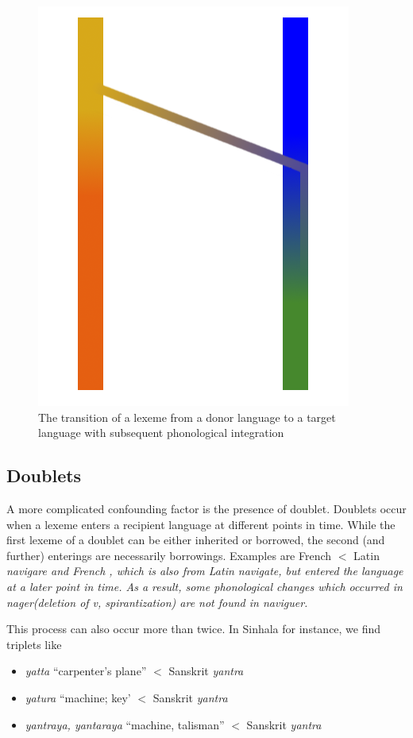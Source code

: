 \documentclass[a4paper,10pt]{article}
\begin{document}
\begin{figure}
\centering
    \includegraphics[height=.3\textheight]{borrowing.png}
\caption{The transition of a lexeme from a donor language to a target language with subsequent phonological integration}
\end{figure}

\subsection{Doublets}
A more complicated confounding factor is the presence of doublet. Doublets occur when a lexeme enters a recipient language at different points in time. While the first lexeme of a doublet can be either inherited or borrowed, the second (and further) enterings are necessarily borrowings. Examples are French $<$ Latin \em navigare \em and French , which is also from Latin \em navigate\em, but entered the language at a later point in time. As a result, some phonological changes which occurred in \em nager\em (deletion of \em v\em, spirantization) are not found in \em naviguer\em.

This process can also occur more than twice. In Sinhala for instance, we find triplets like
\begin{itemize}
   \item  {\em yatta} ``carpenter's plane'' $<$ Sanskrit {\em yantra}
   \item {\em yatura} ``machine; key' $<$ Sanskrit {\em yantra}
   \item {\em yantraya, yantaraya\em} ``machine, talisman'' $<$ Sanskrit {\em yantra}
\end{itemize}
\end{document}

